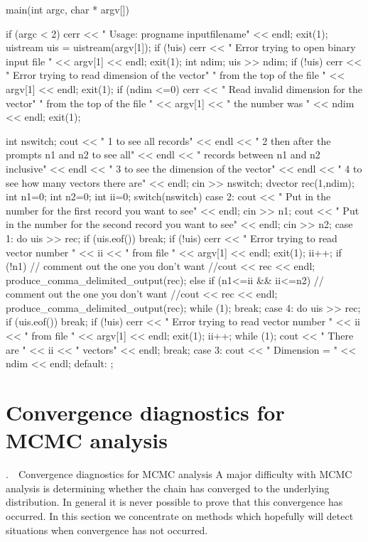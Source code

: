 \documentclass[12pt]{book}
\makeatletter
\def\mysection#1{\section{#1}{\bigbf \medbreak\noindent\number\c@chapter.\number\c@section\ \ #1\medbreak}}
\makeatother
\begin{document}
main(int argc, char * argv[])
{
  if (argc < 2)
  {
    cerr << " Usage:   progname inputfilename" << endl;
    exit(1);
  }
  uistream uis = uistream(argv[1]);
  if (!uis)
  {  
    cerr << " Error trying to open binary input file " 
         <<  argv[1] << endl;
    exit(1);
  }
  int ndim;
  uis >> ndim;
  if (!uis)
  {  
    cerr << " Error trying to read dimension of the vector"
            " from the top of the file " 
         <<  argv[1] << endl;
    exit(1);
  }
  if (ndim <=0)
  {  
    cerr << " Read invalid dimension for the vector"
            " from the top of the file " 
         <<  argv[1] << " the number was " << ndim << endl;
    exit(1);
  }
  
  int nswitch;
  cout << " 1 to see all records" << endl
       << " 2 then after the prompts  n1 and  n2 to see all" << endl
       << " records between n1 and n2 inclusive" <<  endl
       << " 3 to see the dimension of the vector" << endl
       << " 4 to see how many vectors there are" << endl;
  cin >> nswitch;
  dvector rec(1,ndim);
  int n1=0;
  int n2=0;
  int ii=0;
  switch(nswitch)
  {
  case 2:
    cout << " Put in the number for the first record you want to see"
         << endl;
    cin >> n1;
    cout << " Put in the number for the second record you want to see"
         << endl;
    cin >> n2;
  case 1:
    do 
    {
      uis >> rec;
      if  (uis.eof()) break;
      if (!uis) 
      {
        cerr << " Error trying to read vector number " << ii
             << " from file " <<  argv[1] << endl;
        exit(1);
      }
      ii++;
      if (!n1)
      {
        // comment out the one you don't want
        //cout << rec << endl;
        produce_comma_delimited_output(rec);
      }
      else
      {
        if (n1<=ii && ii<=n2)
        {
          // comment out the one you don't want
          //cout << rec << endl;
          produce_comma_delimited_output(rec);
        }
      }
    }
    while (1);
    break; 
  case 4:
    do 
    {
      uis >> rec;
      if  (uis.eof()) break;
      if (!uis) 
      {
        cerr << " Error trying to read vector number " << ii
             << " from file " <<  argv[1] << endl;
        exit(1);
      }
      ii++;
    }
    while (1);
    cout << " There are " << ii << " vectors" << endl;
    break; 
  case 3:
    cout << " Dimension = "  << ndim  << endl;
  default:
    ;
  }
}
\endexample
\mysection{Convergence diagnostics for MCMC analysis}
A major difficulty with MCMC analysis is determining  whether the
chain has converged to the underlying distribution. In general it is
never possible to prove that this convergence has occurred. In this
section we concentrate on methods which hopefully will detect
situations when convergence has not occurred.
\end{document}
